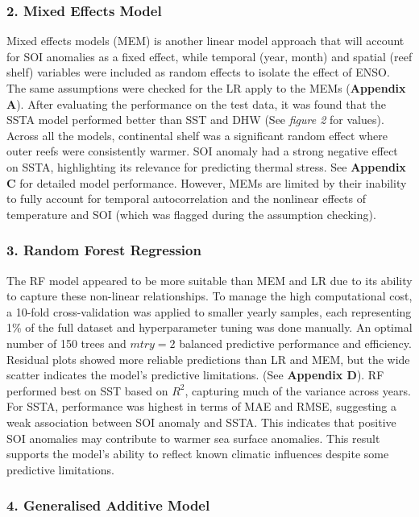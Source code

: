 \documentclass[letterpaper,9pt,twocolumn,twoside,]{pinp}
\begin{document}
\subsubsection{2. Mixed Effects Model}\label{mixed-effects-model}

Mixed effects models (MEM) is another linear model approach that will
account for SOI anomalies as a fixed effect, while temporal (year,
month) and spatial (reef shelf) variables were included as random
effects to isolate the effect of ENSO. The same assumptions were checked
for the LR apply to the MEMs (\textbf{Appendix A}). After evaluating the
performance on the test data, it was found that the SSTA model performed
better than SST and DHW (See \emph{figure 2} for values). Across all the
models, continental shelf was a significant random effect where outer
reefs were consistently warmer. SOI anomaly had a strong negative effect
on SSTA, highlighting its relevance for predicting thermal stress. See
\textbf{Appendix C} for detailed model performance. However, MEMs are
limited by their inability to fully account for temporal autocorrelation
and the nonlinear effects of temperature and SOI (which was flagged
during the assumption checking).

\subsubsection{3. Random Forest
Regression}\label{random-forest-regression}

The RF model appeared to be more suitable than MEM and LR due to its
ability to capture these non-linear relationships. To manage the high
computational cost, a 10-fold cross-validation was applied to smaller
yearly samples, each representing 1\% of the full dataset and
hyperparameter tuning was done manually. An optimal number of 150 trees
and \(mtry = 2\) balanced predictive performance and efficiency.
Residual plots showed more reliable predictions than LR and MEM, but the
wide scatter indicates the model's predictive limitations. (See
\textbf{Appendix D}). RF performed best on SST based on \(R^2\),
capturing much of the variance across years. For SSTA, performance was
highest in terms of MAE and RMSE, suggesting a weak association between
SOI anomaly and SSTA. This indicates that positive SOI anomalies may
contribute to warmer sea surface anomalies. This result supports the
model's ability to reflect known climatic influences despite some
predictive limitations.

\subsubsection{4. Generalised Additive
Model}\label{generalised-additive-model}
\end{document}
